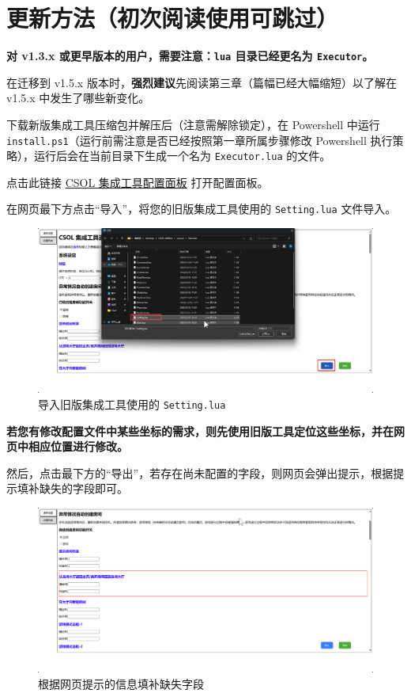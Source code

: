 \section{更新方法（初次阅读使用可跳过）}
\label{how_to_update}

\textbf{\color{red}对 v1.3.x 或更早版本的用户，需要注意：\lstinline{lua} 目录已经更名为 \lstinline{Executor}。}

在迁移到 v1.5.x 版本时，\textbf{\color{red}强烈建议}先阅读第三章（篇幅已经大幅缩短）以了解在 v1.5.x 中发生了哪些新变化。

下载新版集成工具压缩包并解压后（注意需解除锁定），在 Powershell 中运行 \lstinline{install.ps1}（运行前需注意是否已经按照第一章所属步骤修改 Powershell 执行策略），运行后会在当前目录下生成一个名为 \lstinline{Executor.lua} 的文件。

点击此链接 \href{https://www.macrohard.fun/CSOL-Utilities/ConfigPanel}{CSOL 集成工具配置面板} 打开配置面板。

在网页最下方点击“导入”，将您的旧版集成工具使用的 \lstinline{Setting.lua} 文件导入。

\begin{figure}[H]
    \Centering
    \includegraphics[width=\textwidth]{assets/import_setting}
    \caption{导入旧版集成工具使用的 \lstinline{Setting.lua}}
\end{figure}

\textbf{\color{red}若您有修改配置文件中某些坐标的需求，则先使用旧版工具定位这些坐标，并在网页中相应位置进行修改。}

然后，点击最下方的“导出”，若存在尚未配置的字段，则网页会弹出提示，根据提示填补缺失的字段即可。

\begin{figure}[H]
    \Centering
    \includegraphics[width=\textwidth]{assets/export_error}
    \caption{根据网页提示的信息填补缺失字段}
\end{figure}

